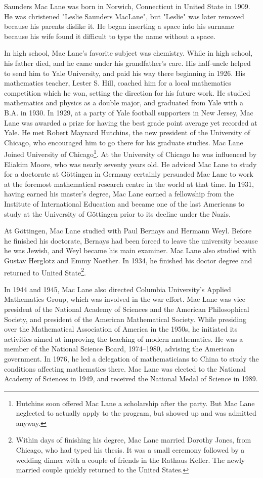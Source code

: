 \documentclass{article}
\begin{document}
Saunders Mac Lane was born in Norwich, Connecticut in United State in 1909. He was christened "Leslie Saunders MacLane", but "Leslie" was later removed because his parents dislike it. He began inserting a space into his surname because his wife found it difficult to type the name without a space.

In high school, Mac Lane's favorite subject was chemistry. While in high school, his father died, and he came under his grandfather's care. His half-uncle helped to send him to Yale University, and paid his way there beginning in 1926. His mathematics teacher, Lester S. Hill, coached him for a local mathematics competition which he won, setting the direction for his future work. He studied mathematics and physics as a double major, and graduated from Yale with a B.A. in 1930. In 1929, at a party of Yale football supporters in New Jersey, Mac Lane was awarded a prize for having the best grade point average yet recorded at Yale. He met Robert Maynard Hutchins, the new president of the University of Chicago, who encouraged him to go there for his graduate studies\cite{Wiki-Mac-Lane}. Mac Lane Joined University of Chicago\footnote{Hutchins soon offered Mac Lane a scholarship after the party. But Mac Lane neglected to actually apply to the program, but showed up and was admitted anyway.}. At the University of Chicago he was influenced by Eliakim Moore, who was nearly seventy years old. He adviced Mac Lane to study for a doctorate at Göttingen in Germany certainly persuaded Mac Lane to work at the foremost mathematical research centre in the world at that time. In 1931, having earned his master's degree, Mac Lane earned a fellowship from the Institute of International Education and became one of the last Americans to study at the University of Göttingen prior to its decline under the Nazis.

At Göttingen, Mac Lane studied with Paul Bernays and Hermann Weyl. Before he finished his doctorate, Bernays had been forced to leave the university because he was Jewish, and Weyl became his main examiner. Mac Lane also studied with Gustav Herglotz and Emmy Noether. In 1934, he finished his doctor degree and returned to United State\footnote{Within days of finishing his degree, Mac Lane married Dorothy Jones, from Chicago, who had typed his thesis. It was a small ceremony followed by a wedding dinner with a couple of friends in the Rathaus Keller. The newly married couple quickly returned to the United States.}.

In 1944 and 1945, Mac Lane also directed Columbia University's Applied Mathematics Group, which was involved in the war effort. Mac Lane was vice president of the National Academy of Sciences and the American Philosophical Society, and president of the American Mathematical Society. While presiding over the Mathematical Association of America in the 1950s, he initiated its activities aimed at improving the teaching of modern mathematics. He was a member of the National Science Board, 1974–1980, advising the American government. In 1976, he led a delegation of mathematicians to China to study the conditions affecting mathematics there. Mac Lane was elected to the National Academy of Sciences in 1949, and received the National Medal of Science in 1989.
\end{document}
